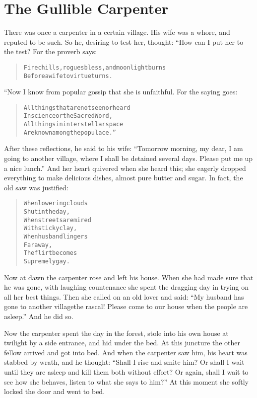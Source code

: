 \documentclass[article, twoside, 14pt]{memoir}
\renewenvironment{verbatim}{%
\begin{quote}%
\vskip -10pt%
\begin{alltt}\normalfont\large}{\end{alltt}%
\end{quote}%
\vskip -10pt
} %
\begin{document}
\chapter{The Gullible Carpenter}

\label{s59}

There was once a carpenter in a certain village. His wife was
a whore, and reputed to be such. So he, desiring to test her,
thought: “How can I put her to the test? For the proverb says:

\begin{verbatim}
Fire chills, rogues bless, and moonlight burns
Before a wife to virtue turns.
\end{verbatim}
“Now I know from popular gossip that she is unfaithful. For the
saying goes:

\begin{verbatim}
All things that are not seen or heard
In science or the Sacred Word,
All things in interstellar space
Are known among the populace.”
\end{verbatim}
After these reflections, he said to his wife:
``Tomorrow morning, my dear, I am going to another village, where I shall be detained several days. Please put me up a nice lunch.''
And her heart quivered when she heard this; she eagerly dropped
everything to make delicious dishes, almost pure butter and sugar.
In fact, the old saw was justified:

\begin{verbatim}
When lowering clouds
    Shut in the day,
When streets are mired
    With sticky clay,
When husband lingers
    Far away,
The flirt becomes
    Supremely gay.
\end{verbatim}
Now at dawn the carpenter rose and left his house. When she had
made sure that he was gone, with laughing countenance she spent the
dragging day in trying on all her best things. Then she called on
an old lover and said:
``My husband has gone to another village{\textemdash}the rascal! Please come to our house when the people are asleep.''
And he did so.

Now the carpenter spent the day in the forest, stole into his own
house at twilight by a side entrance, and hid under the bed. At
this juncture the other fellow arrived and got into bed. And
when the carpenter saw him, his heart was stabbed by wrath, and he
thought:
``Shall I rise and smite him? Or shall I wait until they are asleep and kill them both without effort? Or again, shall I wait to see how she behaves, listen to what she says to him?''
At this moment she softly locked the door and went to bed.
\end{document}
